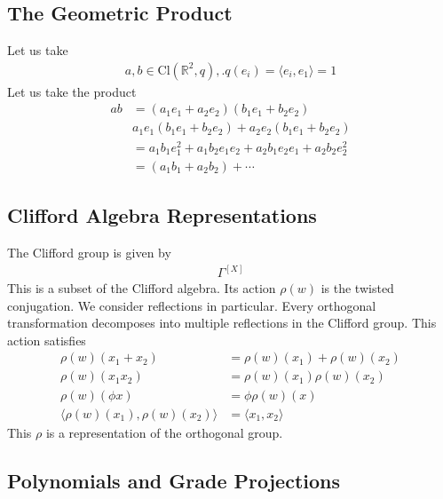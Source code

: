 \documentclass[book.tex]{subfiles}
\begin{document}
\subsection{The Geometric Product}
Let us take
\begin{align}
    a, b \in \mathrm{Cl}(\mathbb{R}^2, q),. q(e_i) = \langle e_i, e_1 \rangle = 1 
\end{align}
Let us take the product
\begin{align}
    ab &= (a_1 e_1 + a_2 e_2)(b_1 e_1 + b_2 e_2) \\
    & a_1e_1(b_1 e_1 + b_2 e_2) + a_2 e_2 (b_1 e_1 + b_2 e_2) \\
    &= a_1 b_1 e_1^2 + a_1 b_2 e_1 e_2 + a_2 b_1 e_2 e_1 + a_2 b_2 e_2^2 \\
    &= (a_1 b_1 + a_2 b_2) + \cdots
\end{align}

\subsection{Clifford Algebra Representations}

The Clifford group is given by
\begin{align}
\Gamma^{[X]}
\end{align}
This is a subset of the Clifford algebra. Its action $\rho(w)$ is the twisted conjugation. We consider reflections in particular. Every orthogonal transformation decomposes into multiple reflections in the Clifford group. This action satisfies
\begin{align}
    \rho(w)(x_1 + x_2) &= \rho(w)(x_1) + \rho(w)(x_2) \\
    \rho(w)(x_1 x_2) &= \rho(w)(x_1) \rho(w)(x_2) \\
    \rho(w)(\phi x) &= \phi \rho(w)(x) \\
    \langle \rho(w)(x_1), \rho(w)(x_2) \rangle &= \langle x_1, x_2 \rangle
\end{align}
This $\rho$ is a representation of the orthogonal group. 
\subsection{Polynomials and Grade Projections}
\end{document}
